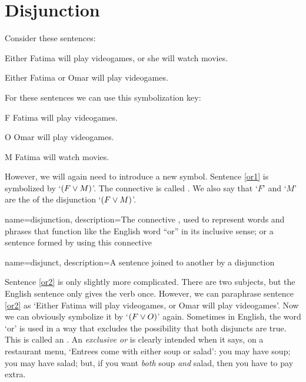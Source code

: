 \section{Disjunction}

Consider these sentences:
	\begin{earg}
		\item[\ex{or1}]Either Fatima will play videogames, or she will watch movies.
		\item[\ex{or2}]Either Fatima or Omar will play videogames. 
	\end{earg}
For these sentences we can use this symbolization key:
	\begin{ekey}
		\item[F] Fatima will play videogames.
		\item[O] Omar will play videogames.
		\item[M] Fatima will watch movies.
	\end{ekey}
However, we will again need to introduce a new symbol. Sentence \ref{or1} is symbolized by `$(F \vee M)$'. The connective is called . We also say that `$F$' and `$M$' are the  of the disjunction `$(F \vee M)$'.

{
name=disjunction,
description={The connective \eor, used to represent words and phrases that function like the English word ``or'' in its inclusive sense; or a sentence formed by using this connective}
}

{
name=disjunct,
description={A sentence joined to another by a \gls{disjunction}}
}

Sentence \ref{or2} is only slightly more complicated. There are two subjects, but the English sentence only gives the verb once. However, we can paraphrase sentence \ref{or2} as `Either Fatima will play videogames, or Omar will play videogames'. Now we can obviously symbolize it by `$(F \vee O)$' again.
Sometimes in English, the word `or' is used in a way that excludes the possibility that both disjuncts are true. This is called an .  An \emph{exclusive or} is clearly intended when it says, on a restaurant menu, `Entrees come with either soup or salad': you may have soup; you may have salad; but, if you want \emph{both} soup \emph{and} salad, then you have to pay extra.

